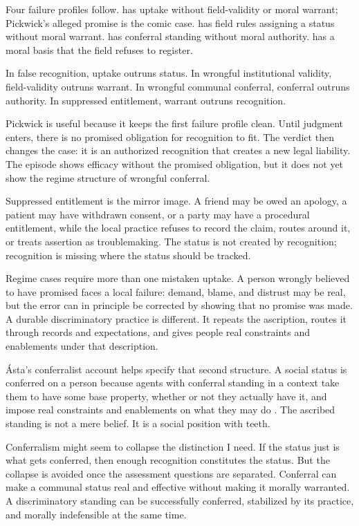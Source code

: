 \documentclass[12pt]{article}
\begin{document}
Four failure profiles follow.  has uptake without field-validity or moral warrant; Pickwick's alleged promise is the comic case.  has field rules assigning a status without moral warrant.  has conferral standing without moral authority.  has a moral basis that the field refuses to register.

In false recognition, uptake outruns status. In wrongful institutional validity, field-validity outruns warrant. In wrongful communal conferral, conferral outruns authority. In suppressed entitlement, warrant outruns recognition.

Pickwick is useful because it keeps the first failure profile clean. Until judgment enters, there is no promised obligation for recognition to fit. The verdict then changes the case: it is an authorized recognition that creates a new legal liability. The episode shows efficacy without the promised obligation, but it does not yet show the regime structure of wrongful conferral.

Suppressed entitlement is the mirror image. A friend may be owed an apology, a patient may have withdrawn consent, or a party may have a procedural entitlement, while the local practice refuses to record the claim, routes around it, or treats assertion as troublemaking. The status is not created by recognition; recognition is missing where the status should be tracked.

Regime cases require more than one mistaken uptake. A person wrongly believed to have promised faces a local failure: demand, blame, and distrust may be real, but the error can in principle be corrected by showing that no promise was made. A durable discriminatory practice is different. It repeats the ascription, routes it through records and expectations, and gives people real constraints and enablements under that description.

Ásta's conferralist account helps specify that second structure. A social status is conferred on a person because agents with conferral standing in a context take them to have some base property, whether or not they actually have it, and impose real constraints and enablements on what they may do \citep{asta2018Categories}. The ascribed standing is not a mere belief. It is a social position with teeth.

Conferralism might seem to collapse the distinction I need. If the status just is what gets conferred, then enough recognition constitutes the status. But the collapse is avoided once the assessment questions are separated. Conferral can make a communal status real and effective without making it morally warranted. A discriminatory standing can be successfully conferred, stabilized by its practice, and morally indefensible at the same time.
\end{document}
